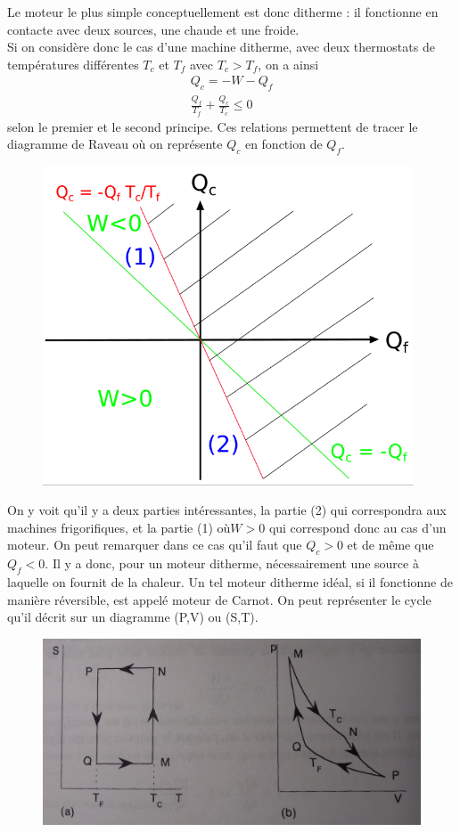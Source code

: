 \documentclass[12pt,prb,aps,epsf]{report}
\begin{document}
Le moteur le plus simple conceptuellement est donc ditherme : il fonctionne en contacte avec deux sources, une chaude et une froide.\\
Si on considère donc le cas d'une machine ditherme, avec deux thermostats de températures différentes $T_c$ et $T_f$ avec $T_c>T_f$, on a ainsi
\begin{eqnarray}
Q_c = -W - Q_f\\
\frac{Q_f}{T_f} + \frac{Q_c}{T_c} \leq 0 \label{5}
\end{eqnarray}
selon le premier et le second principe. Ces relations permettent de tracer le diagramme de Raveau où on représente $Q_c$ en fonction de $Q_f$. 
\begin{figure}[h]
	\centerline{ \includegraphics[width=11cm]{raveau} }
\end{figure}
On y voit qu'il y a deux parties intéressantes, la partie (2) qui correspondra aux machines frigorifiques, et la partie (1) où$W>0$ qui correspond donc au cas d'un moteur. On peut remarquer dans ce cas qu'il faut que $Q_c>0$ et de même que $Q_f<0$. Il y a donc, pour un moteur ditherme, nécessairement une source à laquelle on fournit de la chaleur.
Un tel moteur ditherme idéal, si il fonctionne de manière réversible, est appelé moteur de Carnot. On peut représenter le cycle qu'il décrit sur un diagramme (P,V) ou (S,T).
\begin{figure}[h]
	\centerline{ \includegraphics[width=15cm]{cycle_carnot} }
\end{figure}
\end{document}

